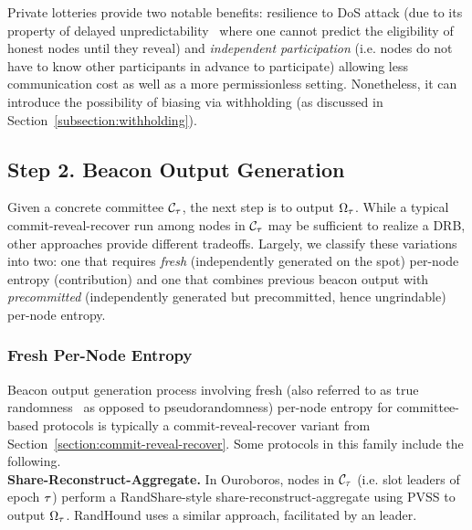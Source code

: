 Private lotteries provide two notable benefits: resilience to DoS attack (due to its property of delayed unpredictability~\cite{azouvi2018winning} where one cannot predict the eligibility of honest nodes until they reveal) and \textit{independent participation} (i.e. nodes do not have to know other participants in advance to participate) allowing less communication cost as well as a more permissionless setting. Nonetheless, it can introduce the possibility of biasing via withholding (as discussed in Section~\ref{subsection:withholding}).

\subsection{Step 2. Beacon Output Generation}
\label{subsection:beacon-output-generation}
Given a concrete committee $\mathcal{C}_\tau$, the next step is to output $\Omega_\tau$. While a typical commit-reveal-recover run among nodes in $\mathcal{C}_\tau$ may be sufficient to realize a DRB, other approaches provide different tradeoffs. Largely, we classify these variations into two: one that requires \textit{fresh} (independently generated on the spot) per-node entropy (contribution) and one that combines previous beacon output with \textit{precommitted} (independently generated but precommitted, hence ungrindable) per-node entropy.

\subsubsection{Fresh Per-Node Entropy}
\label{subsubsection:fresh}
Beacon output generation process involving fresh (also referred to as true randomness~\cite{cascudomt, das2021spurt} as opposed to pseudorandomness) per-node entropy for committee-based protocols is typically a commit-reveal-recover variant from Section~\ref{section:commit-reveal-recover}. Some protocols in this family include the following.\\

\noindent\textbf{Share-Reconstruct-Aggregate.} In Ouroboros, nodes in $\mathcal{C}_\tau$ (i.e. slot leaders of epoch $\tau$) perform a RandShare-style share-reconstruct-aggregate using PVSS to output $\Omega_\tau$. RandHound uses a similar approach, facilitated by an \epoch leader.\\

